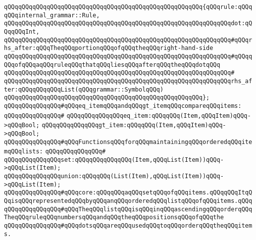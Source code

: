 \verb|qQQqqQQqqQQqqQQqqQQqqQQqqQQqqQQqqQQqqQQqqQQqqQQqqQQqqQQq{qQQqrule:qQQqqQQqinternal_grammar::Rule,|\newline
\verb|qQQqqQQqqQQqqQQqqQQqqQQqqQQqqQQqqQQqqQQqqQQqqQQqqQQqqQQqqQQqqQQqdot:qQQqqQQqInt,|\newline
\newline
\verb|qQQqqQQqqQQqqQQqqQQqqQQqqQQqqQQqqQQqqQQqqQQqqQQqqQQqqQQqqQQqqQQq#qQQqrhs_after:qQQqTheqQQqportionqQQqofqQQqtheqQQqright-hand-side|\newline
\verb|qQQqqQQqqQQqqQQqqQQqqQQqqQQqqQQqqQQqqQQqqQQqqQQqqQQqqQQqqQQqqQQq#qQQqqQQqofqQQqaqQQqruleqQQqthatqQQqliesqQQqafterqQQqtheqQQqdotqQQq|\newline
\verb|qQQqqQQqqQQqqQQqqQQqqQQqqQQqqQQqqQQqqQQqqQQqqQQqqQQqqQQqqQQqqQQq#|\newline
\verb|qQQqqQQqqQQqqQQqqQQqqQQqqQQqqQQqqQQqqQQqqQQqqQQqqQQqqQQqqQQqqQQqrhs_after:qQQqqQQqqQQqList(qQQqgrammar::SymbolqQQq)|\newline
\verb|qQQqqQQqqQQqqQQqqQQqqQQqqQQqqQQqqQQqqQQqqQQqqQQqqQQqqQQq};|\newline
\newline
\verb|qQQqqQQqqQQqqQQq#qQQqeq_itemqQQqandqQQqgt_itemqQQqcompareqQQqitems:|\newline
\verb|qQQqqQQqqQQqqQQq#|\newline
\verb|qQQqqQQqqQQqqQQqeq_item:qQQqqQQq(Item,qQQqItem)qQQq->qQQqBool;|\newline
\verb|qQQqqQQqqQQqqQQqgt_item:qQQqqQQq(Item,qQQqItem)qQQq->qQQqBool;|\newline
\newline
\verb|qQQqqQQqqQQqqQQq#qQQqFunctionsqQQqforqQQqmaintainingqQQqorderedqQQqitemqQQqlists:|\newline
\verb|qQQqqQQqqQQqqQQq#|\newline
\verb|qQQqqQQqqQQqqQQqset:qQQqqQQqqQQqqQQq(Item,qQQqList(Item))qQQq->qQQqList(Item);|\newline
\verb|qQQqqQQqqQQqqQQqunion:qQQqqQQq(List(Item),qQQqList(Item))qQQq->qQQqList(Item);|\newline
\newline
\verb|qQQqqQQqqQQqqQQq#qQQqcore:qQQqqQQqaqQQqsetqQQqofqQQqitems.qQQqqQQqItqQQqisqQQqrepresentedqQQqbyqQQqanqQQqorderedqQQqlistqQQqofqQQqitems.qQQq|\newline
\verb|qQQqqQQqqQQqqQQq#qQQqTheqQQqlistqQQqisqQQqinqQQqascendingqQQqorderqQQqTheqQQqruleqQQqnumbersqQQqandqQQqtheqQQqpositionsqQQqofqQQqthe|\newline
\verb|qQQqqQQqqQQqqQQq#qQQqdotsqQQqareqQQqusedqQQqtoqQQqorderqQQqtheqQQqitems.|\newline
